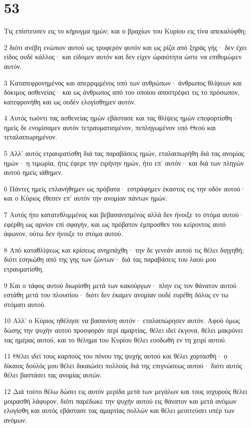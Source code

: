 \chapter{53}

\par Τις επίστευσεν εις το κήρυγμα ημών; και ο βραχίων του Κυρίου εις τίνα απεκαλύφθη;
\par 2 διότι ανέβη ενώπιον αυτού ως τρυφερόν φυτόν και ως ρίζα από ξηράς γής· δεν έχει είδος ουδέ κάλλος· και είδομεν αυτόν και δεν είχεν ώραιότητα ώστε να επιθυμώμεν αυτόν.
\par 3 Καταπεφρονημένος και απερριμμένος υπό των ανθρώπων· άνθρωπος θλίψεων και δόκιμος ασθενείας· και ως άνθρωπος από του οποίου αποστρέφει τις το πρόσωπον, κατεφρονήθη και ως ουδέν ελογίσθημεν αυτόν.
\par 4 Αυτός τωόντι τας ασθενείας ημών εβάστασε και τας θλίψεις ημών επεφορτίσθη· ημείς δε ενομίσαμεν αυτόν τετραυματισμένον, πεπληγωμένον υπό Θεού και τεταλαιπωρημένον.
\par 5 Αλλ' αυτός ετραυματίσθη διά τας παραβάσεις ημών, εταλαιπωρήθη διά τας ανομίας ημών· η τιμωρία, ήτις έφερε την ειρήνην ημών, ήτο επ' αυτόν· και διά των πληγών αυτού ημείς ιάθημεν.
\par 6 Πάντες ημείς επλανήθημεν ως πρόβατα· εστράφημεν έκαστος εις την οδόν αυτού· και ο Κύριος έθεσεν επ' αυτόν την ανομίαν πάντων ημών.
\par 7 Αυτός ήτο κατατεθλιμμένος και βεβασανισμένος αλλά δεν ήνοιξε το στόμα αυτού· εφέρθη ως αρνίον επί σφαγήν, και ως πρόβατον έμπροσθεν του κείροντος αυτό άφωνον, ούτω δεν ήνοιξε το στόμα αυτού.
\par 8 Από καταθλίψεως και κρίσεως ανηρπάχθη· την δε γενεάν αυτού τις θέλει διηγηθή; διότι εσηκώθη από της γης των ζώντων· διά τας παραβάσεις του λαού μου ετραυματίσθη.
\par 9 Και ο τάφος αυτού διωρίσθη μετά των κακούργων· πλην εις τον θάνατον αυτού εστάθη μετά του πλουσίου· διότι δεν έκαμεν ανομίαν ουδέ ευρέθη δόλος εν τω στόματι αυτού.
\par 10 Αλλ' ο Κύριος ηθέλησε να βασανίση αυτόν· εταλαιπώρησεν αυτόν. Αφού όμως δώσης την ψυχήν αυτού προσφοράν περί αμαρτίας, θέλει ιδεί έκγονα, θέλει μακρύνει τας ημέρας αυτού, και το θέλημα του Κυρίου θέλει ευοδωθή εν τη χειρί αυτού.
\par 11 Θέλει ιδεί τους καρπούς του πόνου της ψυχής αυτού και θέλει χορτασθή· ο δίκαιος δούλός μου θέλει δικαιώσει πολλούς διά της επιγνώσεως αυτού· διότι αυτός θέλει βαστάσει τας ανομίας αυτών.
\par 12 Διά τούτο θέλω δώσει εις αυτόν μερίδα μετά των μεγάλων και τους ισχυρούς θέλει μοιρασθή λάφυρον, διότι παρέδωκε την ψυχήν αυτού εις θάνατον και μετά ανόμων ελογίσθη και αυτός εβάστασε τας αμαρτίας πολλών και θέλει μεσιτεύσει υπέρ των ανόμων.

